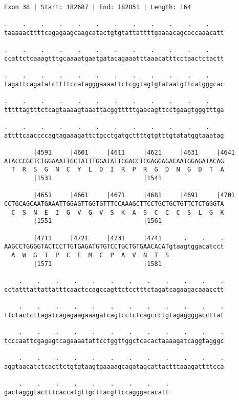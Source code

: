 \documentclass{article}
\begin{document}
\begin{Verbatim}
Exon 38 | Start: 182687 | End: 182851 | Length: 164
 
.    .    .    .    .    .    .    .    .    .    .    .    
taaaaacttttcagagaagcaagcatactgtgtattattttgaaaacagcaccaaacatt
  
.    .    .    .    .    .    .    .    .    .    .    .    
ccattctcaaagtttgcaaaatgaatgatacagaaatttaaacatttcctaactctactt
  
.    .    .    .    .    .    .    .    .    .    .    .    
tagattcagatatcttttccatagggaaaattctcggtagtgtataatgttcatgggcac
  
.    .    .    .    .    .    .    .    .    .    .    .    
tttttagtttctcagtaaaagtaaattacggtttttgaacagttcctgaagtgggtttga
  
.    .    .    .    .    .    .    .    .    .    .    .    
attttcaaccccagtagaaagattctgcctgatgcttttgtgtttgtatatggtaaatag
  
        |4591     |4601     |4611     |4621     |4631     |4641
ATACCCGCTCTGGAAATTGCTATTTGGATATTCGACCTCGAGGAGACAATGGAGATACAG
  T  R  S  G  N  C  Y  L  D  I  R  P  R  G  D  N  G  D  T  A
        |1531                         |1541                 
  
        |4651     |4661     |4671     |4681     |4691     |4701
CCTGCAGCAATGAAATTGGAGTTGGTGTTTCCAAAGCTTCCTGCTGCTGTTCTCTGGGTA
  C  S  N  E  I  G  V  G  V  S  K  A  S  C  C  C  S  L  G  K
        |1551                         |1561                 
  
        |4711     |4721     |4731     |4741      .    .    .
AAGCCTGGGGTACTCCTTGTGAGATGTGTCCTGCTGTGAACACATgtaagtggacatcct
  A  W  G  T  P  C  E  M  C  P  A  V  N  T  S               
        |1571                         |1581                 
  
    .    .    .    .    .    .    .    .    .    .    .    .
cctatttattattatttcaactccagccagttctcctttctagatcagaagacaaacctt
  
    .    .    .    .    .    .    .    .    .    .    .    .
ttctactcttagatcagagaagaaagatcagtcctctcagccctgtagaggggaccttat
  
    .    .    .    .    .    .    .    .    .    .    .    .
tcccaattcgagagtcagaaaatattcctggttggctcacactaaaagatcaggtagggc
  
    .    .    .    .    .    .    .    .    .    .    .    .
aggtaacatctcacttctgtgtaagtgaaaagcagatagcattactttaaagattttcca
  
    .    .    .    .    .    .    .    .    .
gactagggtactttcaccatgttgcttacgttccagggacacatt
\end{Verbatim}
\end{document}
